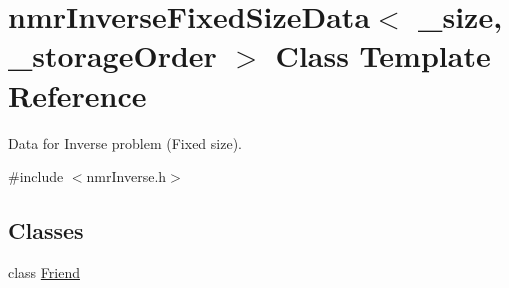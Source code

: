 \hypertarget{classnmr_inverse_fixed_size_data}{\section{nmr\-Inverse\-Fixed\-Size\-Data$<$ \-\_\-size, \-\_\-storage\-Order $>$ Class Template Reference}
\label{classnmr_inverse_fixed_size_data}
}


Data for Inverse problem (Fixed size).  




{\ttfamily \#include $<$nmr\-Inverse.\-h$>$}

\subsection*{Classes}
\begin{DoxyCompactItemize}
\item 
class \hyperlink{classnmr_inverse_fixed_size_data_1_1_friend}{Friend}
\end{DoxyCompactItemize}
